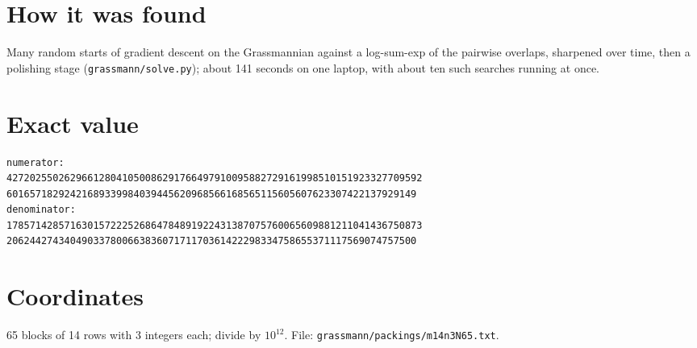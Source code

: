 \documentclass[11pt,a4paper]{article}
\begin{document}
\section{How it was found}
Many random starts of gradient descent on the Grassmannian against a log-sum-exp of the pairwise overlaps, sharpened over time, then a polishing stage (\texttt{grassmann/solve.py}); about 141 seconds on one laptop, with about ten such searches running at once.


\appendix
\section{Exact value}
{\small
\begin{verbatim}
numerator:
427202550262966128041050086291766497910095882729161998510151923327709592
60165718292421689339984039445620968566168565115605607623307422137929149
denominator:
178571428571630157222526864784891922431387075760065609881211041436750873
20624427434049033780066383607171170361422298334758655371117569074757500
\end{verbatim}}

\section{Coordinates}
65 blocks of 14 rows with 3 integers each; divide by $10^{12}$. File: \texttt{grassmann/packings/m14n3N65.txt}.
{\tiny
\begin{multicols}{3}
\end{multicols}}
\end{document}

